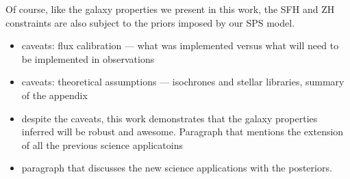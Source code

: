 Of course, like the galaxy properties we present in this work, the SFH and ZH
constraints are also subject to the priors imposed by our SPS model. 



\begin{itemize}
    \item caveats: flux calibration --- what was implemented versus what will
    need to be implemented in observations
    \item caveats: theoretical assumptions --- isochrones and stellar
        libraries, summary of the appendix
\end{itemize}

\begin{itemize}
\item despite the caveats, this work demonstrates that the galaxy
    properties inferred will be robust and awesome. Paragraph that mentions
    the extension of all the previous science applicatoins 
\item paragraph that discusses the new science applications with the
    posteriors. 
\end{itemize}
